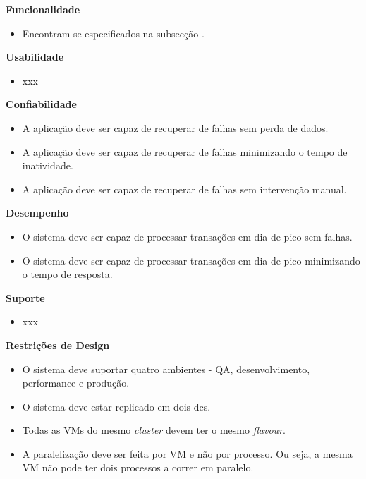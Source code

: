 \vspace{5mm}

\textbf{Funcionalidade}
\begin{itemize}
  \item Encontram-se especificados na subsecção .
\end{itemize}

\textbf{Usabilidade}
\begin{itemize}
  \item xxx
\end{itemize}

\textbf{Confiabilidade}
\begin{itemize}
  \item A aplicação deve ser capaz de recuperar de falhas sem perda de dados.
  \item A aplicação deve ser capaz de recuperar de falhas minimizando o tempo de inatividade.
  \item A aplicação deve ser capaz de recuperar de falhas sem intervenção manual.
\end{itemize}

\textbf{Desempenho}
\begin{itemize}
  \item O sistema deve ser capaz de processar transações em dia de pico sem falhas.
  \item O sistema deve ser capaz de processar transações em dia de pico minimizando o tempo de resposta.
\end{itemize}

\textbf{Suporte}
\begin{itemize}
  \item xxx
\end{itemize}

\textbf{Restrições de Design}
\begin{itemize}
  \item O sistema deve suportar quatro ambientes - \ac{QA}, desenvolvimento, 
    performance e produção.
  \item O sistema deve estar replicado em dois \glspl{dc}.
  \item Todas as \acp{VM} do mesmo \textit{cluster} devem ter o mesmo \textit{\gls{flavour}}.
  \item A paralelização deve ser feita por \ac{VM} e não por processo. Ou seja, a mesma \ac{VM} 
    não pode ter dois processos a correr em paralelo.
\end{itemize}

